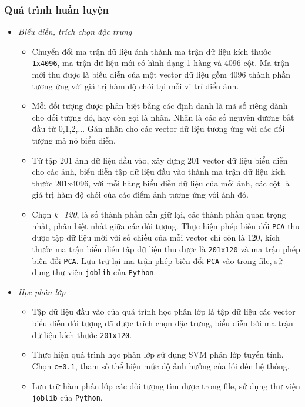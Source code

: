 \documentclass[12pt,a4paper]{article}
\begin{document}
\subsubsection{Quá trình huấn luyện} 
\begin{itemize}
\item \textit{Biểu diễn, trích chọn đặc trưng}
\begin{itemize}
\item Chuyển đổi ma trận dữ liệu ảnh thành ma trận dữ liệu kích thước \texttt{1x4096}, ma trận dữ liệu mới có hình dạng 1 hàng và 4096 cột. Ma trận mới thu được là biểu diễn của một vector dữ liệu gồm 4096 thành phần tương ứng với giá trị hàm độ chói tại mỗi vị trí điển ảnh. 
\item Mỗi đối tượng được phân biệt bằng các định danh là mã số riêng dành cho đối tượng đó, hay còn gọi là nhãn. Nhãn là các số nguyên dương bắt đầu từ 0,1,2,... Gán nhãn cho các vector dữ liệu tương ứng với các đối tượng mà nó biểu diễn.   
\item Từ tập 201 ảnh dữ liệu đầu vào, xây dựng 201 vector dữ liệu biểu diễn cho các ảnh, biểu diễn tập dữ liệu đầu vào thành ma trận dữ liệu kích thước 201x4096, với mỗi hàng biểu diễn dữ liệu của mỗi ảnh, các cột là giá trị hàm độ chói của các điểm ảnh tương ứng với ảnh đó. 
\item Chọn \textit{k=120}, là số thành phần cần giữ lại, các thành phần quan trọng nhất, phân biệt nhất giữa các đối tượng. Thực hiện phép biến đổi \texttt{PCA} thu được tập dữ liệu mới với số chiều của mỗi vector chỉ còn là 120, kích thước ma trận biểu diễn tập dữ liệu thu được là \texttt{201x120} và ma trận phép biến đổi \texttt{PCA}. Lưu trữ lại ma trận phép biến đổi \texttt{PCA} vào trong file, sử dụng thư viện \texttt{joblib} của \texttt{Python}.   
\end{itemize}
\item \textit{Học phân lớp}
\begin{itemize}
\item Tập dữ liệu đầu vào của quá trình học phân lớp là tập dữ liệu các vector biểu diễn đối tượng đã được trích chọn đặc trưng, biểu diễn bởi ma trận dữ liệu kích thước \texttt{201x120}. 
\item Thực hiện quá trình học phân lớp sử dụng SVM phân lớp tuyến tính. Chọn \texttt{c=0.1}, tham số thể hiện mức độ ảnh hưởng của lỗi đến hệ thống. 
\item Lưu trữ hàm phân lớp các đối tượng tìm được trong file, sử dụng thư viện \texttt{joblib} của \texttt{Python}.  
\end{itemize}
\end{itemize}
\end{document}
